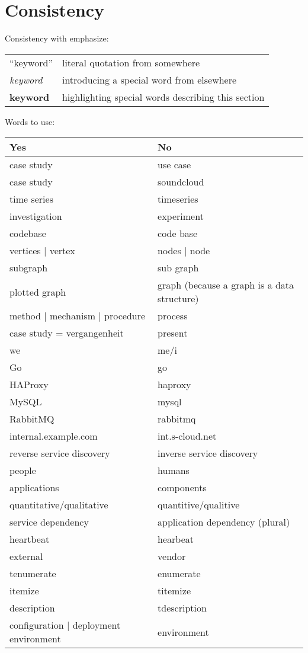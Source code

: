 \section{Consistency}

Consistency with emphasize:
\begin{tabular}{ |l|l| }
  \hline
 ``keyword'' & literal quotation from somewhere \\
  \emph{keyword} & introducing a special word from elsewhere \\
  \textbf{keyword} & highlighting special words describing this section \\
  \hline
\end{tabular}

Words to use:
\begin{tabular}{ |l|l| }
  \hline
  Yes & No \\
  \hline
  case study & use case \\
  case study & soundcloud \\
  time series & timeseries \\
  investigation & experiment \\
  codebase & code base \\
  vertices | vertex &  nodes | node \\
  subgraph & sub graph \\
  plotted graph & graph (because a graph is a data structure)\\
  method | mechanism | procedure & process \\
  case study = vergangenheit & present \\
  we & me/i \\
  Go & go \\
  HAProxy & haproxy \\
  MySQL & mysql \\
  RabbitMQ & rabbitmq \\
  internal.example.com & int.s-cloud.net \\
  reverse service discovery & inverse service discovery \\
  people & humans \\
  applications & components \\
  quantitative/qualitative & quantitive/qualitive \\
  service dependency & application dependency (plural)\\
  heartbeat & hearbeat \\
  external & vendor \\
  tenumerate & enumerate \\
  itemize & titemize \\
  description & tdescription \\
  configuration | deployment environment & environment \\
  \hline
\end{tabular}

